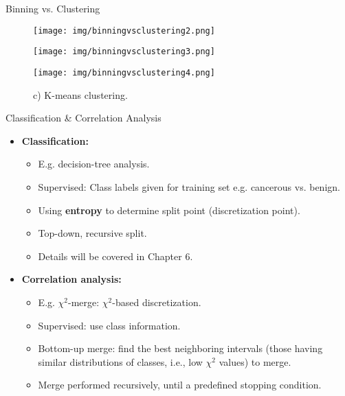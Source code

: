 \begin{frame}{Binning vs. Clustering}
	\begin{figure}[H]
		\centering
		\begin{minipage}{0.32\textwidth}
			\texttt{[image: img/binningvsclustering2.png]}
			\caption{a) Equal interval width (binning).}
		\end{minipage}
		\begin{minipage}{0.32\textwidth}
			\centering
			\texttt{[image: img/binningvsclustering3.png]}
			\caption{b) Equal frequency (binning).}
		\end{minipage}
		\begin{minipage}{0.32\textwidth}
			\centering
			\texttt{[image: img/binningvsclustering4.png]}
			\caption{c) K-means clustering.}
		\end{minipage}\hfill
	\end{figure}
\end{frame}

\begin{frame}{Classification \& Correlation Analysis}
	\begin{itemize}
		\item \textbf{Classification:}
		      \begin{itemize}
			      \item E.g. decision-tree analysis.
			      \item Supervised: Class labels given for training set e.g.
			            cancerous vs. benign.
			      \item Using \textbf{entropy} to determine split point
			            (discretization point).
			      \item Top-down, recursive split.
			      \item Details will be covered in Chapter 6.
		      \end{itemize}
		\item \textbf{Correlation analysis:}
		      \begin{itemize}
			      \item E.g. $\chi^2$-merge: $\chi^2$-based discretization.
			      \item Supervised: use class information.
			      \item Bottom-up merge: find the best neighboring intervals (those
			            having similar distributions of classes, i.e., low $\chi^2$ values)
			            to merge.
			      \item Merge performed recursively, until a predefined stopping
			            condition.
		      \end{itemize}
	\end{itemize}
\end{frame}

